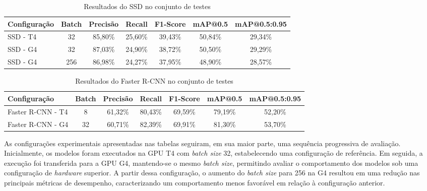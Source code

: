 \begin{table}[H]
    \caption{Resultados do SSD no conjunto de testes}
    \label{tab:resultados-ssd}
    \centering
    \small
    \begin{tabular}{lcccccc}
        \toprule
        \textbf{Configuração} & \textbf{Batch} & \textbf{Precisão} & \textbf{Recall} & \textbf{F1-Score} & \textbf{mAP@0.5} & \textbf{mAP@0.5:0.95} \\
        \midrule
        SSD - T4 & 32  & 85,80\% & 25,60\% & 39,43\% & 50,84\% & 29,34\% \\
        SSD - G4 & 32  & 87,03\% & 24,90\% & 38,72\% & 50,50\% & 29,29\% \\
        SSD - G4 & 256 & 86,98\% & 24,27\% & 37,95\% & 48,90\% & 28,57\% \\
        \bottomrule
    \end{tabular}
\end{table}
\vspace{-1em}

\begin{table}[H]
    \caption{Resultados do Faster R-CNN no conjunto de testes}
    \label{tab:resultados-faster-rcnn}
    \centering
    \small
    \begin{tabular}{lcccccc}
        \toprule
        \textbf{Configuração} & \textbf{Batch} & \textbf{Precisão} & \textbf{Recall} & \textbf{F1-Score} & \textbf{mAP@0.5} & \textbf{mAP@0.5:0.95} \\
        \midrule
        Faster R-CNN - T4 & 8   & 61,32\% & 80,43\% & 69,59\% & 79,19\% & 52,20\% \\
        Faster R-CNN - G4 & 32  & 60,71\% & 82,39\% & 69,91\% & 81,30\% & 53,70\% \\
        \bottomrule
    \end{tabular}
\end{table}
\vspace{-1em}

As configurações experimentais apresentadas nas tabelas seguiram, em sua maior parte, uma sequência
progressiva de avaliação. Inicialmente, os modelos foram executados na GPU T4 com \textit{batch size} 32,
estabelecendo uma configuração de referência. Em seguida, a execução foi transferida para a GPU G4,
mantendo-se o mesmo \textit{batch size}, permitindo avaliar o comportamento dos modelos sob uma
configuração de \textit{hardware} superior. A partir dessa configuração, o aumento do \textit{batch size}
para 256 na G4 resultou em uma redução nas principais métricas de desempenho, caracterizando um
comportamento menos favorável em relação à configuração anterior.


